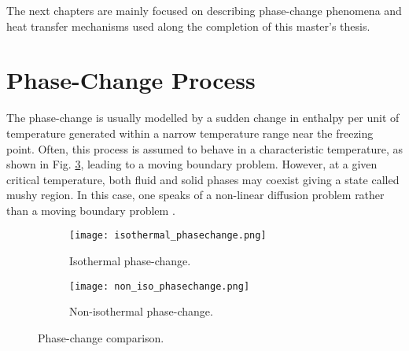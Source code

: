 The next chapters are mainly focused on describing phase-change phenomena and heat transfer mechanisms used along the completion of this master's thesis.


\section{Phase-Change Process}
The phase-change is usually modelled by a sudden change in enthalpy per unit of temperature generated within a narrow temperature range near the freezing point. Often, this process is assumed to behave in a characteristic temperature, as shown in Fig. \ref{1.1}, leading to a moving boundary problem. However, at a given critical temperature, both fluid and solid phases may coexist giving a state called mushy region. In this case, one speaks of a non-linear diffusion problem rather than a moving boundary problem \cite{krabbenhoft_damkilde_nazem_2006}. 
 
\begin{figure}
	\begin{subfigure}{0.50\textwidth}
		\centering
		\texttt{[image: isothermal\_phasechange.png]}\hfill
		\caption{Isothermal phase-change.} 
		\label{1.1a}
	\end{subfigure}
	\hfill
	\begin{subfigure}{0.50\textwidth}
		\centering
		\texttt{[image: non\_iso\_phasechange.png]}	
		\caption{Non-isothermal phase-change.}
		\label{1.1b}
	\end{subfigure}
\caption{Phase-change comparison.}
\label{1.1}
\end{figure}

